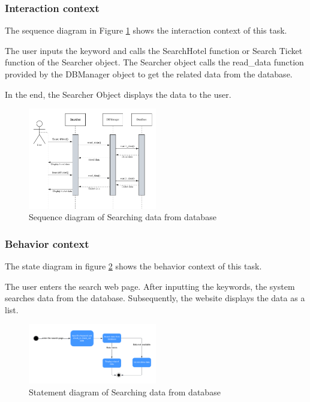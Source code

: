 \documentclass[conference]{IEEEtran}
\begin{document}
\subsubsection{\textbf{Interaction context }}
\textbf{}

The sequence diagram in Figure \ref{sequence1} shows the interaction context of this task. 

The user inputs the keyword and calls the SearchHotel function or Search Ticket function of the Searcher object. The Searcher object calls the read\_data function provided by the DBManager object to get the related data from the database.

In the end, the Searcher Object displays the data to the user.
\begin{figure}[htbp]
	\centerline{\includegraphics[width=0.5\textwidth]{image/searching hotel sequence1.pdf}}
	\caption{Sequence diagram of Searching data from database }
	\label{sequence1}
\end{figure}

\subsubsection{\textbf{Behavior context }}

\textbf{}

The state diagram in figure \ref{statement1} shows the behavior context of this task. 

The user enters the search web page.  After inputting the keywords, the system searches data from the database. Subsequently, the website displays the data as a list. 

\begin{figure}[htbp]
	\centerline{\includegraphics[width=0.5\textwidth]{image/searching hotel statement1.pdf}}
	\caption{Statement diagram of Searching data from database }
	\label{statement1}
\end{figure}
\end{document}
